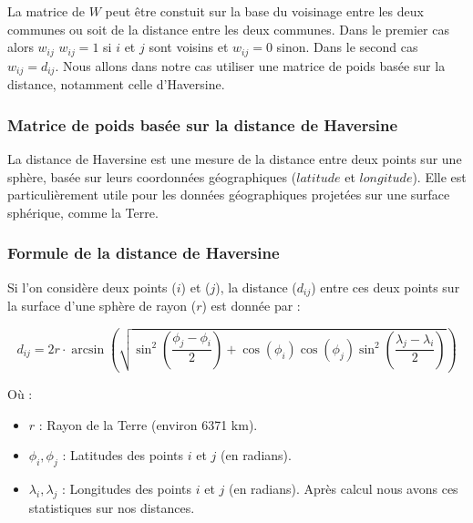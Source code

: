 \documentclass[
]{article}
\begin{document}
La matrice de \(W\) peut être constuit sur la base du voisinage entre
les deux communes ou soit de la distance entre les deux communes. Dans
le premier cas alors \(w_{ij}\) \(w_{ij} = 1\) si \(i\) et \(j\) sont
voisins et \(w_{ij} = 0\) sinon. Dans le second cas \(w_{ij} = d_{ij}\).
Nous allons dans notre cas utiliser une matrice de poids basée sur la
distance, notamment celle d'Haversine.

\subsubsection{Matrice de poids basée sur la distance de
Haversine}\label{matrice-de-poids-basuxe9e-sur-la-distance-de-haversine}

La distance de Haversine est une mesure de la distance entre deux points
sur une sphère, basée sur leurs coordonnées géographiques (\(latitude\)
et \(longitude\)). Elle est particulièrement utile pour les données
géographiques projetées sur une surface sphérique, comme la Terre.

\subsubsection{Formule de la distance de
Haversine}\label{formule-de-la-distance-de-haversine}

Si l'on considère deux points (\(i\)) et (\(j\)), la distance
(\(d_{ij}\)) entre ces deux points sur la surface d'une sphère de rayon
(\(r\)) est donnée par :

\[
 d_{ij} = 2r \cdot \arcsin\left(\sqrt{\sin^2\left(\frac{\phi_j - \phi_i}{2}\right) + \cos(\phi_i)\cos(\phi_j)\sin^2\left(\frac{\lambda_j - \lambda_i}{2}\right)}\right)
\]

Où :

\begin{itemize}
\item
  \(r\) : Rayon de la Terre (environ 6371 km).
\item
  \(\phi_i, \phi_j\) : Latitudes des points \(i\) et \(j\) (en radians).
\item
  \(\lambda_i, \lambda_j\) : Longitudes des points \(i\) et \(j\) (en
  radians). Après calcul nous avons ces statistiques sur nos distances.
\end{itemize}
\end{document}
